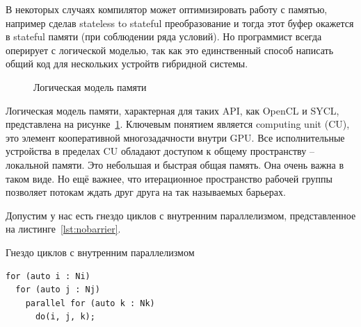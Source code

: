В некоторых случаях компилятор может оптимизировать работу с памятью, например сделав stateless to stateful преобразование и тогда этот буфер окажется в stateful памяти (при соблюдении ряда условий). Но программист всегда оперирует с логической моделью, так как это единственный способ написать общий код для нескольких устройтв гибридной системы.

\begin{figure}[ht]
    \caption{Логическая модель памяти}\label{fig:logical-memory}
\end{figure}

Логическая модель памяти, характерная для таких API, как OpenCL и SYCL, представлена на рисунке~\cref{fig:logical-memory}. Ключевым понятием является computing unit (CU), это элемент кооперативной многозадачности внутри GPU. Все исполнительные устройства в пределах CU обладают доступом к общему пространству -- локальной памяти. Это небольшая и быстрая общая память. Она очень важна в таком виде. Но ещё важнее, что итерационное пространство рабочей группы позволяет потокам ждать друг друга на так называемых барьерах.

Допустим у нас есть гнездо циклов с внутренним параллелизмом, представленное на листинге~\cref{lst:nobarrier}.

\begin{ListingEnv}[!h]
    \captiondelim{ } 
    \caption{Гнездо циклов с внутренним параллелизмом}\label{lst:nobarrier}
    \begin{lstlisting}[language={[ISO]C++}]
for (auto i : Ni)
  for (auto j : Nj)
    parallel for (auto k : Nk)
      do(i, j, k);
    \end{lstlisting}
\end{ListingEnv}

